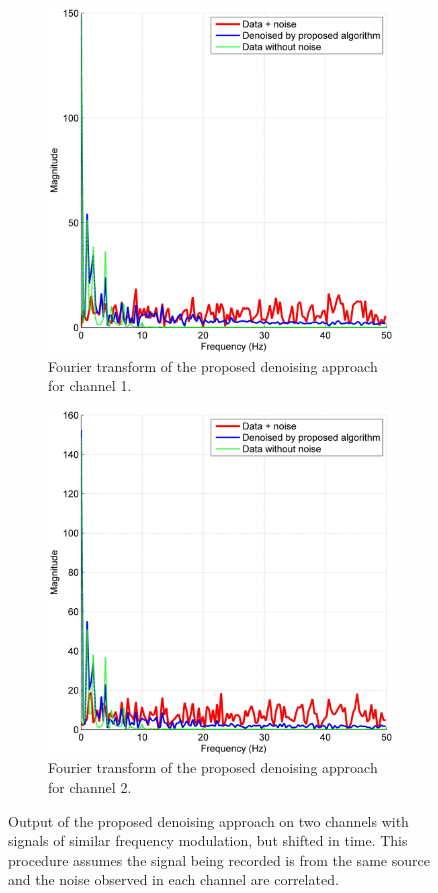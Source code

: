 \documentclass[onecolumn, groupedaddress, 10pt]{revtex4-1}
\begin{document}
\begin{figure}[ht]
	\centering
	\begin{subfigure}{.5\textwidth}
  		\centering
  		\includegraphics[width=.9\linewidth]{denoise_1.jpg}
  		\caption{\label{fig:denoise_1} Fourier transform of the proposed denoising approach for channel 1.}
	\end{subfigure}%
	\begin{subfigure}{.5\textwidth}
  		\centering
  		\includegraphics[width=.9\linewidth]{denoise_2.jpg}
  		\caption{\label{fig:denoise_2} Fourier transform of the proposed denoising approach for channel 2.}
	\end{subfigure}
	\caption{Output of the proposed denoising approach on two channels with signals of similar frequency modulation, but shifted in time. This procedure assumes the signal being recorded is from the same source and the noise observed in each channel are correlated.}
\end{figure}
\end{document}
